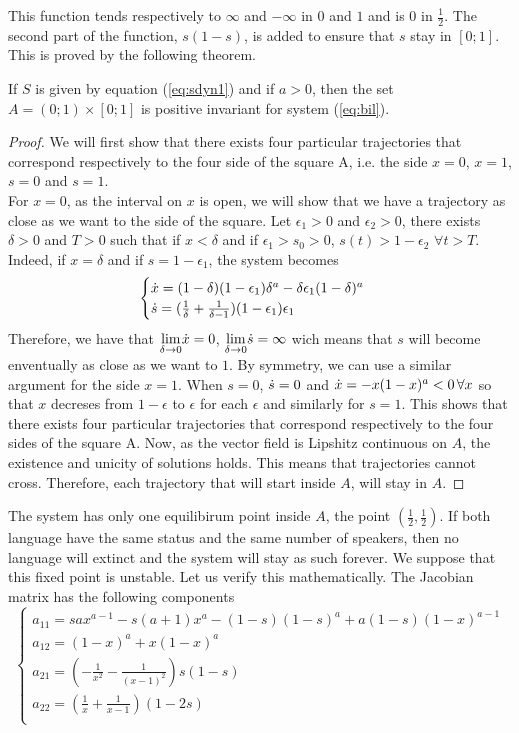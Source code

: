 \documentclass{article}
\begin{document}
This function tends respectively to $\infty$ and $-\infty$ in $0$ and $1$ and is $0$ in $\frac{1}{2}$.
The second part of the function, $s(1-s)$, is added to ensure that $s$ stay in $[0;1]$.
This is proved by the following theorem. \\

\begin{theorem}{}
\label{posinv}
If $S$ is given by equation (\ref{eq:sdyn1}) and if $a>0$, then the set $A = (0;1) \times [0;1]$ is positive invariant for system (\ref{eq:bil}).
\end{theorem}

\begin{proof}
We will first show that there exists four particular trajectories that correspond respectively to the four side of the square A, i.e. the side $x=0$, $x=1$, $s=0$ and $s=1$. \\
For $x=0$, as the interval on $x$ is open, we will show that we have a trajectory as close as we want to the side of the square.
Let $\epsilon_1>0$ and $\epsilon_2 >0$, there exists $\delta > 0$ and $T > 0$ such that if $x < \delta$ and  if $\epsilon_1>s_0>0$, $s(t) > 1- \epsilon_2 \, \, \forall t > T$.
Indeed, if $x = \delta$ and  if $s=1-\epsilon_1$, the system becomes
\[
\begin{cases}
\dot{x} =  (1-\delta)(1-\epsilon_1)\delta^a - \delta\epsilon_1(1-\delta)^a  \\
\dot{s} = (\frac{1}{\delta}+\frac{1}{\delta-1})(1-\epsilon_1)\epsilon_1 \\
\end{cases}
\]
Therefore, we have that $\underset{\delta \rightarrow 0}{\text{lim}} \dot{x} = 0$, $\underset{\delta \rightarrow 0}{\text{lim}} \dot{s} = \infty$ wich means that $s$ will become enventually as close as we want to $1$. By symmetry, we can use a similar argument for the side $x=1$.
When $s=0$, $\dot{s} = 0$ and $\dot{x} = -x(1-x)^a < 0 \, \forall{x}$ so that $x$ decreses from $1-\epsilon$ to $\epsilon$ for each $\epsilon$ and similarly for $s=1$.
This shows that there exists four particular trajectories that correspond respectively to the four sides of the square A.
Now, as the vector field is Lipshitz continuous on $A$, the existence and unicity of solutions holds.
This means that trajectories cannot cross.
Therefore, each trajectory that will start inside $A$, will stay in $A$.
\end{proof}

The system has only one equilibirum point inside $A$, the point $(\frac{1}{2}, \frac{1}{2})$.
If both language have the same status and the same number of speakers, then no language will extinct and the system will stay as such forever.
We suppose that this fixed point is unstable.
Let us verify this mathematically.
The Jacobian matrix has the following components
\[
\begin{cases}
a_{11} = sax^{a-1} - s(a+1)x^a - (1-s)(1-s)^a + a(1-s)(1-x)^{a-1} \\
a_{12} = (1-x)^a + x(1-x)^a \\
a_{21} = (-\frac{1}{x^2}-\frac{1}{(x-1)^2})s(1-s) \\
a_{22} = (\frac{1}{x}+\frac{1}{x-1})(1-2s) \\
\end{cases}
\]
\end{document}
